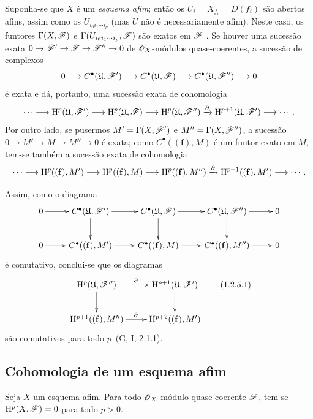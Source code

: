 \begin{remark}[1.2.5]
\label{III.1.2.5}
Suponha-se que $X$ é um \emph{esquema afim}; então os $U_i=X_{f_i}=D(f_i)$ são abertos afins, assim como os $U_{i_0 i_1\cdots i_p}$ (mas $U$ não é necessariamente afim).
Neste caso, os funtores $\Gamma(X,\mathscr{F})$ e $\Gamma(U_{i_0 i_1\cdots i_p},\mathscr{F})$ são exatos em $\mathscr{F}$ .
Se houver uma sucessão exata $0\to\sh{F}'\to\sh{F}\to\sh{F}''\to 0$ de $\mathscr{O}_X$-módulos quase-coerentes, a sucessão de complexos
\[
  0\to C^\bullet(\mathfrak{U},\sh{F}')\to C^\bullet(\mathfrak{U},\sh{F})\to C^\bullet(\mathfrak{U},\sh{F}'')\to 0
\]
é exata e dá, portanto, uma sucessão exata de cohomologia
\[
  \cdots\to\HH^p(\mathfrak{U},\sh{F}')\to\HH^p(\mathfrak{U},\sh{F})\to\HH^p(\mathfrak{U},\sh{F}'')\xrightarrow{\partial}\HH^{p+1}(\mathfrak{U},\sh{F}')\to\cdots.
\]
Por outro lado, se pusermos $M'=\Gamma(X,\mathscr{F}')$ e $M''=\Gamma(X,\mathscr{F}'')$, a sucessão $0\to M'\to M\to M''\to 0$ é exata; como $C^\bullet((\mathbf{f}),M)$ é um funtor exato em $M$, tem-se também a sucessão exata de cohomologia
\[
  \cdots\to\HH^p((\mathbf{f}),M')\to\HH^p((\mathbf{f}),M)\to\HH^p((\mathbf{f}),M'')\xrightarrow{\partial}\HH^{p+1}((\mathbf{f}),M')\to\cdots.
\]

Assim, como o diagrama
\[
  \xymatrix{
    0\ar[r] &
    C^\bullet(\mathfrak{U},\sh{F}')\ar[r]\ar[d] &
    C^\bullet(\mathfrak{U},\sh{F})\ar[r]\ar[d] &
    C^\bullet(\mathfrak{U},\sh{F}'')\ar[r]\ar[d] &
    0\\
    0\ar[r] &
    C^\bullet((\mathbf{f}),M')\ar[r] &
    C^\bullet((\mathbf{f}),M)\ar[r] &
    C^\bullet((\mathbf{f}),M'')\ar[r] &
    0
  }
\]
é comutativo, conclui-se que os diagramas
\[
  \xymatrix{
    \HH^p(\mathfrak{U},\sh{F}'')\ar[r]^\partial\ar[d] &
    \HH^{p+1}(\mathfrak{U},\sh{F}')\ar[d]\\
    \HH^{p+1}((\mathbf{f}),M'')\ar[r]^\partial &
    \HH^{p+2}((\mathbf{f}),M')
  }
  \tag{1.2.5.1}
\]
são comutativos para todo $p$~(G, I, 2.1.1).
\end{remark}

\subsection{Cohomologia de um esquema afim}
\label{subsection:III.1.3}

\begin{theorem}[1.3.1]
\label{III.1.3.1}
Seja $X$ um esquema afim.
Para todo $\mathscr{O}_X$-módulo quase-coerente $\mathscr{F}$, tem-se $\mathrm{H}^p(X,\mathscr{F})=0$ para todo $p>0$.
\end{theorem}

